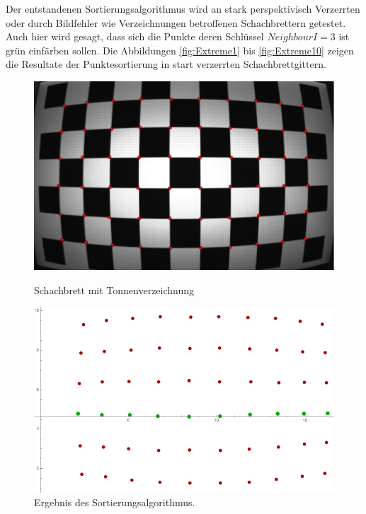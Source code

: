 Der entstandenen Sortierungsalgorithmus wird an stark perspektivisch Verzerrten oder durch Bildfehler wie Verzeichnungen betroffenen Schachbrettern getestet. Auch hier wird gesagt, dass sich die Punkte deren Schlüssel $NeighbourI = 3$ ist grün einfärben sollen. Die Abbildungen \ref{fig:Extreme1} bis \ref{fig:Extreme10} zeigen die Resultate der Punktesortierung in start verzerrten Schachbrettgittern.




\begin{figure}[!htb]
	\includegraphics[width=\linewidth]{images/Tonnenverzeichnung.png}
	\caption[Schachbrett mit Tonnenverzeichnung]{Schachbrett mit Tonnenverzeichnung}
	\label{fig:Extreme1}
	\endminipage\hfill
	\includegraphics[width=\linewidth]{images/AlgTonnenverzeichnung.png}
	\caption[Sortierte Punkte eines Schachbretts mit Tonnenverzeichnung]{Ergebnis des Sortierungsalgorithmus.}
	\label{fig:Extreme2}
	\endminipage\hfill
\end{figure}

